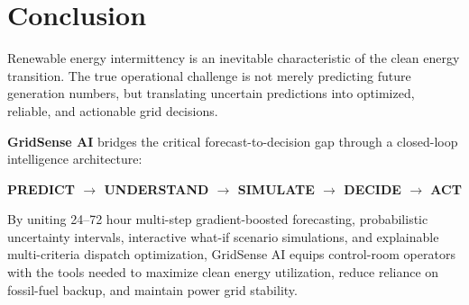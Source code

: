 \section{Conclusion}
\label{sec:conclusion}

Renewable energy intermittency is an inevitable characteristic of the clean energy transition. The true operational challenge is not merely predicting future generation numbers, but translating uncertain predictions into optimized, reliable, and actionable grid decisions.

\textbf{GridSense AI} bridges the critical forecast-to-decision gap through a closed-loop intelligence architecture:
\begin{center}
    \textbf{\color{primaryNavy}PREDICT $\longrightarrow$ UNDERSTAND $\longrightarrow$ SIMULATE $\longrightarrow$ DECIDE $\longrightarrow$ ACT}
\end{center}

By uniting 24--72 hour multi-step gradient-boosted forecasting, probabilistic uncertainty intervals, interactive what-if scenario simulations, and explainable multi-criteria dispatch optimization, GridSense AI equips control-room operators with the tools needed to maximize clean energy utilization, reduce reliance on fossil-fuel backup, and maintain power grid stability.

